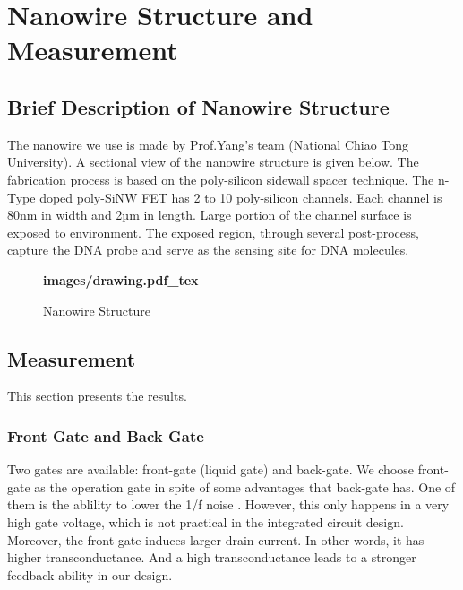 \chapter{Nanowire Structure and Measurement}
\section{Brief Description of Nanowire Structure}
The nanowire we use is made by Prof.Yang's team (National Chiao Tong University)\cite{J8}.
A sectional view of the nanowire structure is given below.
The fabrication process is based on the poly-silicon sidewall spacer technique.
The n-Type doped poly-SiNW FET has 2 to 10 poly-silicon channels.
Each channel is 80nm in width and 2µm in length.
Large portion of the channel surface is exposed to environment.
The exposed region, through several post-process, capture the DNA probe and serve as the sensing site for DNA molecules.\cite{C5, C6}

\begin{figure}[!htbp]
    \centering
    {\selectfont\textbf{
        \def\svgwidth{5.0cm}
        \fontsize{6}{7}\selectfont
         {images/drawing.pdf_tex}
    }}
    \fontsize{6}{7}\selectfont
    \caption{Nanowire Structure}
    \label{fig:res}
\end{figure}



\section{Measurement}
This section presents the results.

\subsection*{Front Gate and Back Gate}
Two gates are available: front-gate (liquid gate) and back-gate.
We choose front-gate as the operation gate in spite of some advantages that back-gate has.
One of them is the ablility to lower the 1/f noise \cite{C7, C8}.
However, this only happens in a very high gate voltage, which is not practical in the integrated circuit design.
Moreover, the front-gate induces larger drain-current.
In other words, it has higher transconductance. And a high transconductance leads to a stronger feedback ability in our design.

%


